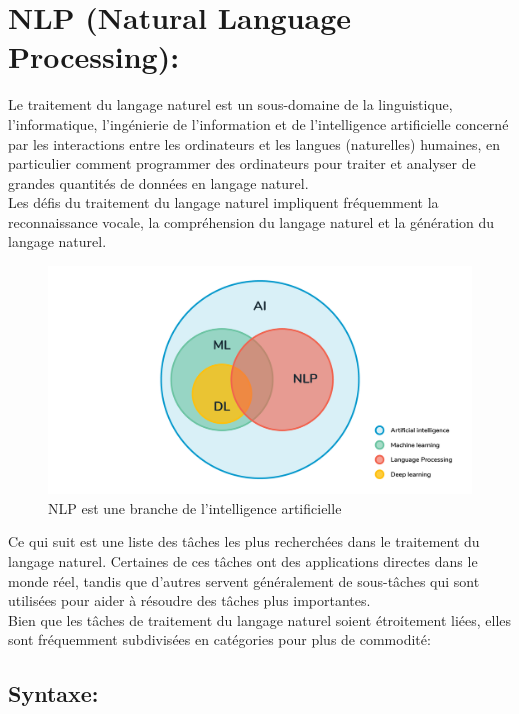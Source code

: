\section{NLP (Natural Language Processing):}
Le traitement du langage naturel est un sous-domaine de la linguistique, l'informatique, l'ingénierie de l'information et de l'intelligence artificielle concerné par les interactions entre les ordinateurs et les langues (naturelles) humaines, en particulier comment programmer des ordinateurs pour traiter et analyser de grandes quantités de données en langage naturel.\\

Les défis du traitement du langage naturel impliquent fréquemment la reconnaissance vocale, la compréhension du langage naturel et la génération du langage naturel.

\begin{figure}[H]
    \centering
    \includegraphics[width=\textwidth]{chapitre2/assets/nlp.png}
    \caption{NLP est une branche de l'intelligence artificielle}
    \label{fig:my_label}
\end{figure}

Ce qui suit est une liste des tâches les plus recherchées dans le traitement du langage naturel. Certaines de ces tâches ont des applications directes dans le monde réel, tandis que d'autres servent généralement de sous-tâches qui sont utilisées pour aider à résoudre des tâches plus importantes.\\

Bien que les tâches de traitement du langage naturel soient étroitement liées, elles sont fréquemment subdivisées en catégories pour plus de commodité:

\subsection{Syntaxe:}
